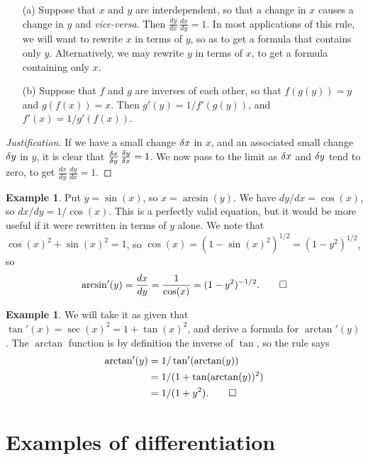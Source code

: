 \documentclass[a4paper]{book}
\theoremstyle{definition}
\newtheorem{example}[theorem]{Example}
\begin{document}
\begin{itemize}
 \item[(a)] Suppose that $x$ and $y$ are interdependent, so that a
  change in $x$ causes a change in $y$ and \emph{vice-versa}.  Then 
  $\frac{dy}{dx}\,\frac{dx}{dy}=1$.  In most applications of this
  rule, we will want to rewrite $x$ in terms of $y$, so as to get a
  formula that contains only $y$.  Alternatively, we may rewrite $y$
  in terms of $x$, to get a formula containing only $x$.
 \item[(b)] Suppose that $f$ and $g$ are inverses of each other, so
  that $f(g(y))=y$ and $g(f(x))=x$.  Then $g'(y)=1/f'(g(y))$, and
  $f'(x)=1/g'(f(x))$. 
\end{itemize}
\begin{proof}[Justification]
 If we have a small change $\delta x$ in $x$, and an associated small
 change $\delta y$ in $y$, it is clear that
 $\frac{\delta x}{\delta y}\,\frac{\delta y}{\delta x}=1$.  We now pass to the
 limit as $\delta x$ and $\delta y$ tend to zero, to get
 $\frac{dx}{dy}\,\frac{dy}{dx}=1$. 
\end{proof}
\begin{example}
 Put $y=\sin(x)$, so $x=\arcsin(y)$.  We have $dy/dx=\cos(x)$, so
 $dx/dy=1/\cos(x)$.  This is a perfectly valid equation, but it would
 be more useful if it were rewritten in terms of $y$ alone.  We note
 that $\cos(x)^2+\sin(x)^2=1$, so
 $\cos(x)=(1-\sin(x)^2)^{1/2}=(1-y^2)^{1/2}$, so 
 \[ \arcsin'(y) = \frac{dx}{dy} =
     \frac{1}{\cos(x)} = (1-y^2)^{-1/2}. \qed
 \] 
\end{example}
\begin{example}
 We will take it as given that $\tan'(x)=\sec(x)^2=1+\tan(x)^2$, and
 derive a formula for $\arctan'(y)$.  The $\arctan$ function is by
 definition the inverse of $\tan$, so the rule says
 \begin{align*}
  \arctan'(y) &= 1/\tan'(\arctan(y)) \\
              &= 1/(1 + \tan(\arctan(y))^2) \\
              &= 1/(1 + y^2). \qed
 \end{align*}
\end{example}

\section{Examples of differentiation}
\label{sec-diff-eg}
\end{document}
